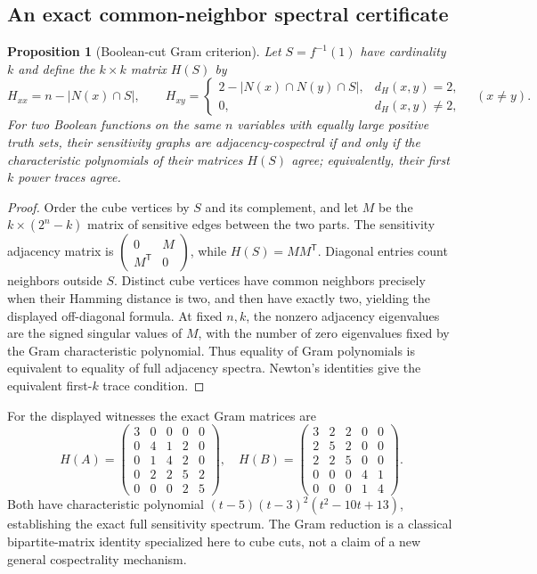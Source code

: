\documentclass[twoside,12pt,letterpaper]{article}
\newtheorem{proposition}{Proposition}
\theoremstyle{definition}
\begin{document}
\subsection{An exact common-neighbor spectral certificate}
\begin{proposition}[Boolean-cut Gram criterion]\label{prop:gram}
Let $S=f^{-1}(1)$ have cardinality $k$ and define the $k\times k$ matrix $H(S)$ by
\[
H_{xx}=n-|N(x)\cap S|,\qquad
H_{xy}=\begin{cases}2-|N(x)\cap N(y)\cap S|,&d_H(x,y)=2,\\0,&d_H(x,y)\ne2,\end{cases}\quad(x\ne y).
\]
For two Boolean functions on the same $n$ variables with equally large positive truth sets, their sensitivity graphs are adjacency-cospectral if and only if the characteristic polynomials of their matrices $H(S)$ agree; equivalently, their first $k$ power traces agree.
\end{proposition}
\begin{proof}
Order the cube vertices by $S$ and its complement, and let $M$ be the $k\times(2^n-k)$ matrix of sensitive edges between the two parts. The sensitivity adjacency matrix is $\left(\begin{smallmatrix}0&M\\M^{\mathsf T}&0\end{smallmatrix}\right)$, while $H(S)=MM^{\mathsf T}$. Diagonal entries count neighbors outside $S$. Distinct cube vertices have common neighbors precisely when their Hamming distance is two, and then have exactly two, yielding the displayed off-diagonal formula. At fixed $n,k$, the nonzero adjacency eigenvalues are the signed singular values of $M$, with the number of zero eigenvalues fixed by the Gram characteristic polynomial. Thus equality of Gram polynomials is equivalent to equality of full adjacency spectra. Newton's identities give the equivalent first-$k$ trace condition.
\end{proof}

For the displayed witnesses the exact Gram matrices are
\[
H(A)=\begin{pmatrix}3&0&0&0&0\\0&4&1&2&0\\0&1&4&2&0\\0&2&2&5&2\\0&0&0&2&5\end{pmatrix},\quad
H(B)=\begin{pmatrix}3&2&2&0&0\\2&5&2&0&0\\2&2&5&0&0\\0&0&0&4&1\\0&0&0&1&4\end{pmatrix}.
\]
Both have characteristic polynomial $(t-5)(t-3)^2(t^2-10t+13)$, establishing the exact full sensitivity spectrum. The Gram reduction is a classical bipartite-matrix identity specialized here to cube cuts, not a claim of a new general cospectrality mechanism.
\end{document}
